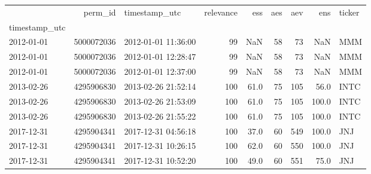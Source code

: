\begin{tabular}{lrlrrrrrl}
\toprule
{} &     perm\_id &        timestamp\_utc &  relevance &   ess &  aes &  aev &    ens & ticker \\
timestamp\_utc &             &                      &            &       &      &      &        &        \\
\midrule
2012-01-01    &  5000072036 &  2012-01-01 11:36:00 &         99 &   NaN &   58 &   73 &    NaN &    MMM \\
2012-01-01    &  5000072036 &  2012-01-01 12:28:47 &         99 &   NaN &   58 &   73 &    NaN &    MMM \\
2012-01-01    &  5000072036 &  2012-01-01 12:37:00 &         99 &   NaN &   58 &   73 &    NaN &    MMM \\
2013-02-26    &  4295906830 &  2013-02-26 21:52:14 &        100 &  61.0 &   75 &  105 &   56.0 &   INTC \\
2013-02-26    &  4295906830 &  2013-02-26 21:53:09 &        100 &  61.0 &   75 &  105 &  100.0 &   INTC \\
2013-02-26    &  4295906830 &  2013-02-26 21:55:22 &        100 &  61.0 &   75 &  105 &  100.0 &   INTC \\
2017-12-31    &  4295904341 &  2017-12-31 04:56:18 &        100 &  37.0 &   60 &  549 &  100.0 &    JNJ \\
2017-12-31    &  4295904341 &  2017-12-31 10:26:15 &        100 &  62.0 &   60 &  550 &  100.0 &    JNJ \\
2017-12-31    &  4295904341 &  2017-12-31 10:52:20 &        100 &  49.0 &   60 &  551 &   75.0 &    JNJ \\
\bottomrule
\end{tabular}
